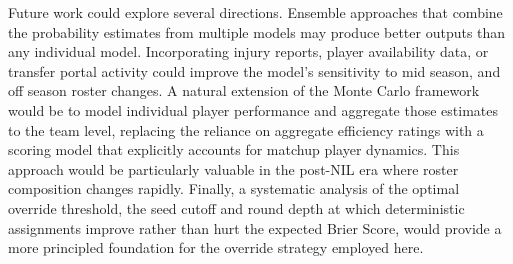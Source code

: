 \documentclass[12pt,leqno]{article}\usepackage[pdftex]{graphicx}\usepackage[dvipsnames]{xcolor}
\theoremstyle{remark}
\begin{document}
Future work could explore several directions. Ensemble approaches that combine the probability estimates from multiple models may produce better outputs than any individual model. Incorporating injury reports, player availability data, or transfer portal activity could improve the model's sensitivity to mid season, and off season roster changes. A natural extension of the Monte Carlo framework would be to model individual player performance and aggregate those estimates to the team level, replacing the reliance on aggregate efficiency ratings with a scoring model that explicitly accounts for matchup player dynamics. This approach would be particularly valuable in the post-NIL era where roster composition changes rapidly. Finally, a systematic analysis of the optimal override threshold, the seed cutoff and round depth at which deterministic assignments improve rather than hurt the expected Brier Score, would provide a more principled foundation for the override strategy employed here.

\clearpage

\end{document}
